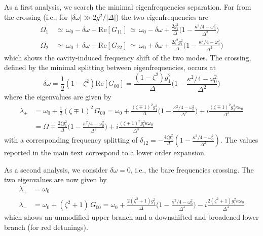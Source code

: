\documentclass[aps,PRA,%
 amsmath,amssymb,
singlecolumn,
notitlepage,superscriptaddress,groupedaddress]{revtex4}
\newcommand{\di}{i}
\begin{document}
As a first analysis, we search the minimal eigenfrequencies separation. Far from the crossing (i.e., for $|\delta\omega| \gg 2 g^2/|\Delta|$) the two eigenfrequencies are
\begin{align}
    \Omega_1&\,\simeq\,\omega_0-\delta\omega+\mathrm{Re}[G_{11}] \,\simeq\,\omega_0-\delta\omega+\frac{2g_1^2}{\Delta}\bigg( 1-\frac{\kappa^2/4-\omega_0^2}{\Delta^2}\bigg)\\
   \Omega_2&\,\simeq\,\omega_0+\delta\omega+\mathrm{Re}[G_{22}] \,\simeq\, \omega_0+\delta\omega+\frac{2\zeta^2 g_1^2}{\Delta}\bigg( 1-\frac{\kappa^2/4-\omega_0^2}{\Delta^2}\bigg)
\end{align}
\noindent which shows the cavity-induced frequency shift of the two modes. The crossing, defined by the minimal splitting between eigenfrequencies, occurs at
\begin{equation}
    \delta\omega=\frac{1}{2}\left(1-\zeta^2\right) \mathrm{Re}[G_{00}] = \frac{(1-\zeta^2)g_1^2}{\Delta} \bigg( 1-\frac{\kappa^2/4-\omega_0^2}{\Delta^2}\bigg)
\end{equation}
\noindent where the eigenvalues are given by
\begin{align}\label{eqs_eigen1}
    \lambda_\pm& 
    =\omega_0+\frac{1}{2}(\zeta\mp1)^2 \,G_{00}
    =\omega_0+\frac{(\zeta\mp1)^2g_1^2}{\Delta}\bigg(1-\frac{\kappa^2/4-\omega_0^2}{\Delta^2}\bigg)+\di \frac{(\zeta\mp1)^2g_1^2\kappa\omega_0}{\Delta^3}\\
    &=\Omega\mp \frac{2\zeta g_1^2}{\Delta}\bigg(1-\frac{\kappa^2/4-\omega_0^2}{\Delta^2}\bigg)+\di \frac{(\zeta\mp1)^2g_1^2\kappa\omega_0}{\Delta^3}
\end{align}
\noindent with a corresponding frequency splitting of $\delta_{12}=-\frac{4\zeta g_1^2}{\Delta}(1-\frac{\kappa^2/4-\omega_0^2}{\Delta^2})$.  The values reported in the main text correspond to a lower order expansion. 

As a second analysis, we consider $\delta\omega=0$, i.e., the bare frequencies crossing. The two eigenvalues are now given by
\begin{align}
    \lambda_+&=\omega_0\\
    \lambda_-&=
    \omega_0+(\zeta^2+1)\,G_{00}
    =\omega_0+\frac{2(\zeta^2+1)g_1^2}{\Delta}\bigg(1-\frac{\kappa^2/4-\omega_0^2}{\Delta^3}\bigg)-\di\frac{2(\zeta^2+1)g_1^2\kappa\omega_0}{\Delta^3}
\end{align}
\noindent which shows an unmodified upper branch and a downshifted and broadened  lower branch (for red detunings).
\end{document}
